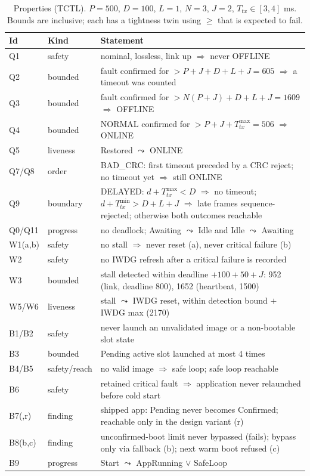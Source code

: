 \documentclass[conference,a4paper]{IEEEtran}
\begin{document}
\begin{table}[t]
\centering\footnotesize
\caption{Properties (TCTL). $P{=}500$, $D{=}100$, $L{=}1$, $N{=}3$, $J{=}2$, $T_{tx}\in[3,4]$ ms. Bounds are inclusive; each has a tightness twin using $\ge$ that is expected to fail.}
\label{tab:props}
\setlength{\tabcolsep}{4pt}
\begin{tabularx}{\columnwidth}{@{}l l >{\raggedright\arraybackslash}X@{}}
\toprule
Id & Kind & Statement \\
\midrule
Q1 & safety & nominal, lossless, link up $\Rightarrow$ never OFFLINE \\
Q2 & bounded & fault confirmed for $> P{+}J{+}D{+}L{+}J = 605$ $\Rightarrow$ a timeout was counted \\
Q3 & bounded & fault confirmed for $> N(P{+}J){+}D{+}L{+}J = 1609$ $\Rightarrow$ OFFLINE \\
Q4 & bounded & NORMAL confirmed for $> P{+}J{+}T_{tx}^{\max} = 506$ $\Rightarrow$ ONLINE \\
Q5 & liveness & Restored $\leadsto$ ONLINE \\
Q7/Q8 & order & BAD\_CRC: first timeout preceded by a CRC reject; no timeout yet $\Rightarrow$ still ONLINE \\
Q9 & boundary & DELAYED: $d{+}T_{tx}^{\max}{<}D$ $\Rightarrow$ no timeout; $d{+}T_{tx}^{\min}{>}D{+}L{+}J$ $\Rightarrow$ late frames sequence-rejected; otherwise both outcomes reachable \\
Q0/Q11 & progress & no deadlock; Awaiting $\leadsto$ Idle and Idle $\leadsto$ Awaiting \\
W1(a,b) & safety & no stall $\Rightarrow$ never reset (a), never critical failure (b) \\
W2 & safety & no IWDG refresh after a critical failure is recorded \\
W3 & bounded & stall detected within deadline ${+}100{+}50{+}J$: 952 (link, deadline 800), 1652 (heartbeat, 1500) \\
W5/W6 & liveness & stall $\leadsto$ IWDG reset, within detection bound ${+}$ IWDG max (2170) \\
B1/B2 & safety & never launch an unvalidated image or a non-bootable slot state \\
B3 & bounded & Pending active slot launched at most 4 times \\
B4/B5 & safety/reach & no valid image $\Rightarrow$ safe loop; safe loop reachable \\
B6 & safety & retained critical fault $\Rightarrow$ application never relaunched before cold start \\
B7(,r) & finding & shipped app: Pending never becomes Confirmed; reachable only in the design variant (r) \\
B8(b,c) & finding & unconfirmed-boot limit never bypassed (fails); bypass only via fallback (b); next warm boot refused (c) \\
B9 & progress & Start $\leadsto$ AppRunning $\lor$ SafeLoop \\
\bottomrule
\end{tabularx}
\end{table}
\end{document}
